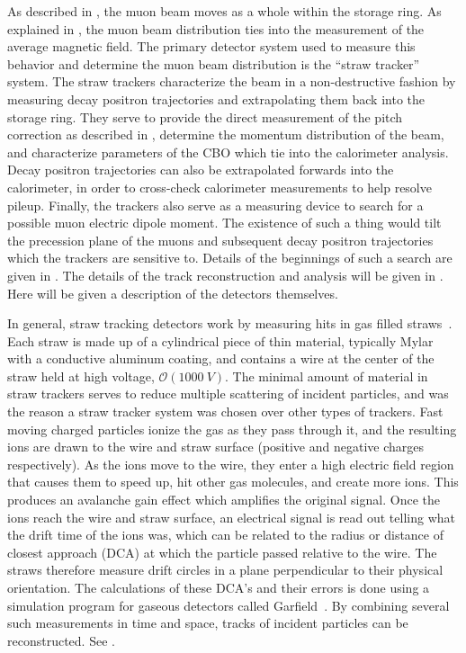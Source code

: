 As described in , the muon beam moves as a whole within the storage ring. As explained in , the muon beam distribution ties into the measurement of the average magnetic field. The primary detector system used to measure this behavior and determine the muon beam distribution is the ``straw tracker'' system. The straw trackers characterize the beam in a non-destructive fashion by measuring decay positron trajectories and extrapolating them back into the storage ring. They serve to provide the direct measurement of the pitch correction as described in , determine the momentum distribution of the beam, and characterize parameters of the CBO which tie into the calorimeter \wa analysis. Decay positron trajectories can also be extrapolated forwards into the calorimeter, in order to cross-check calorimeter measurements to help resolve pileup. Finally, the trackers also serve as a measuring device to search for a possible muon electric dipole moment. The existence of such a thing would tilt the precession plane of the muons and subsequent decay positron trajectories which the trackers are sensitive to. Details of the beginnings of such a search are given in . The details of the track reconstruction and analysis will be given in . Here will be given a description of the detectors themselves.


In general, straw tracking detectors work by measuring hits in gas filled straws~\cite{Blum}. Each straw is made up of a cylindrical piece of thin material, typically Mylar with a conductive aluminum coating, and contains a wire at the center of the straw held at high voltage, $\mathcal{O}(\SI{1000}{V})$. The minimal amount of material in straw trackers serves to reduce multiple scattering of incident particles, and was the reason a straw tracker system was chosen over other types of trackers. Fast moving charged particles ionize the gas as they pass through it, and the resulting ions are drawn to the wire and straw surface (positive and negative charges respectively). As the ions move to the wire, they enter a high electric field region that causes them to speed up, hit other gas molecules, and create more ions. This produces an avalanche gain effect which amplifies the original signal. Once the ions reach the wire and straw surface, an electrical signal is read out telling what the drift time of the ions was, which can be related to the radius or distance of closest approach (DCA) at which the particle passed relative to the wire. The straws therefore measure drift circles in a plane perpendicular to their physical orientation. The calculations of these DCA's and their errors is done using a simulation program for gaseous detectors called Garfield~\cite{garfield1,garfield2}. By combining several such measurements in time and space, tracks of incident particles can be reconstructed. See .

